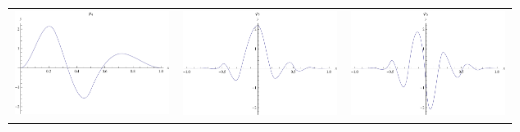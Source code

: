 \documentclass{article}
\begin{document}
\begin{landscape}
\begin{tabular}{ccc}
\includegraphics[width=6.7cm]{cubic_bspline_4.pdf}& \includegraphics[width=6.7cm]{cubic_bspline_5.pdf}& \includegraphics[width=6.7cm]{cubic_bspline_6.pdf} \\
\end{tabular} 
 \end{landscape}
\end{document}
